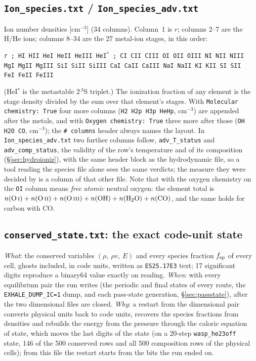 \documentclass[english,a4paper]{my_memo}
\begin{document}
\subsection{\texttt{Ion\_species.txt} / \texttt{Ion\_species\_adv.txt}}
Ion number densities [cm$^{-3}$] (34 columns). Column~1 is $r$; columns 2--7 are
the H/He ions; columns 8--34 are the 27 metal-ion stages, in this order:
\begin{center}\small
\texttt{r ;\ HI HII HeI HeII HeIII HeI$^*$ ;\ CI CII CIII OI OII OIII NI NII NIII
MgI MgII MgIII SiI SiII SiIII CaI CaII CaIII NaI NaII KI KII SI SII FeI FeII
FeIII}
\end{center}
(HeI$^*$ is the metastable $2\,^3$S triplet.) The ionization fraction of any
element is the stage density divided by the sum over that element's stages.
With \texttt{Molecular chemistry: True} four more columns (\texttt{H2 H2p H3p
HeHp}, cm$^{-3}$) are appended after the metals, and with
\texttt{Oxygen chemistry: True} three more after those (\texttt{OH H2O CO},
cm$^{-3}$); the \texttt{\# columns} header always names the layout. In
\texttt{Ion\_species\_adv.txt} two further columns follow, \texttt{adv\_T\_status}
and \texttt{adv\_comp\_status}, the validity of the row's temperature and of its
composition (\S\ref{sec:hydroioniz}), with the same header block as the
hydrodynamic file, so a tool reading the species file alone sees the same
verdicts; the measure they were decided by is a column of that other file. Note that
with the oxygen chemistry on the \texttt{OI} column means \emph{free atomic}
neutral oxygen: the element total is
$n({\rm O\,\textsc{i}})+n({\rm O\,\textsc{ii}})+n({\rm O\,\textsc{iii}})
+n({\rm OH})+n({\rm H_2O})+n({\rm CO})$, and the same holds for carbon with
CO.

\subsection{\texttt{conserved\_state.txt}: the exact code-unit state}
\label{sec:conservedstate}
\emph{What}: the conserved variables $(\rho,\ \rho v,\ E)$ and every species
fraction $f_{\rm sp}$ of every cell, ghosts included, in code units, written
as \texttt{ES25.17E3} text; 17 significant digits reproduce a binary64 value
exactly on reading. \emph{When}: with every equilibrium pair the run writes
(the periodic and final states of every route, the \texttt{EXHALE\_DUMP\_IC=1}
dump, and each pass-state generation, \S\ref{sec:passstate}), after the two
dimensional files are closed. \emph{Why}: a restart from the dimensional pair
converts physical units back to code units, recovers the species fractions
from densities and rebuilds the energy from the pressure through the caloric
equation of state, which moves the last digits of the state (on a 20-step
\texttt{wasp\_he23off} state, 146 of the 500 conserved rows and all 500
composition rows of the physical cells); from this file the restart starts
from the bits the run ended on.
\end{document}
